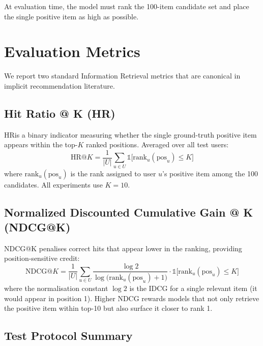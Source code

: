 \documentclass[11pt,a4paper]{article}
\begin{document}
At evaluation time, the model must rank the 100-item candidate set and place the single positive item as high as possible.

\section{Evaluation Metrics}

We report two standard Information Retrieval metrics that are canonical in implicit recommendation literature.

\subsection{Hit Ratio @ K (HR\@K)}

HR\@K is a binary indicator measuring whether the single ground-truth positive item appears within the top-$K$ ranked positions. Averaged over all test users:
\begin{equation}
  \text{HR}@K = \frac{1}{|U|} \sum_{u \in U} \mathbb{1}\bigl[\text{rank}_{u}(\text{pos}_u) \leq K\bigr]
\end{equation}
where $\text{rank}_{u}(\text{pos}_u)$ is the rank assigned to user $u$'s positive item among the 100 candidates. All experiments use $K=10$.

\subsection{Normalized Discounted Cumulative Gain @ K (NDCG@K)}

NDCG@K penalises correct hits that appear lower in the ranking, providing position-sensitive credit:
\begin{equation}
  \text{NDCG}@K = \frac{1}{|U|} \sum_{u \in U} \frac{\log 2}{\log\bigl(\text{rank}_{u}(\text{pos}_u) + 1\bigr)} \cdot \mathbb{1}\bigl[\text{rank}_{u}(\text{pos}_u) \leq K\bigr]
\end{equation}
where the normalisation constant $\log 2$ is the IDCG for a single relevant item (it would appear in position 1). Higher NDCG rewards models that not only retrieve the positive item within top-10 but also surface it closer to rank 1.

\subsection{Test Protocol Summary}
\end{document}
